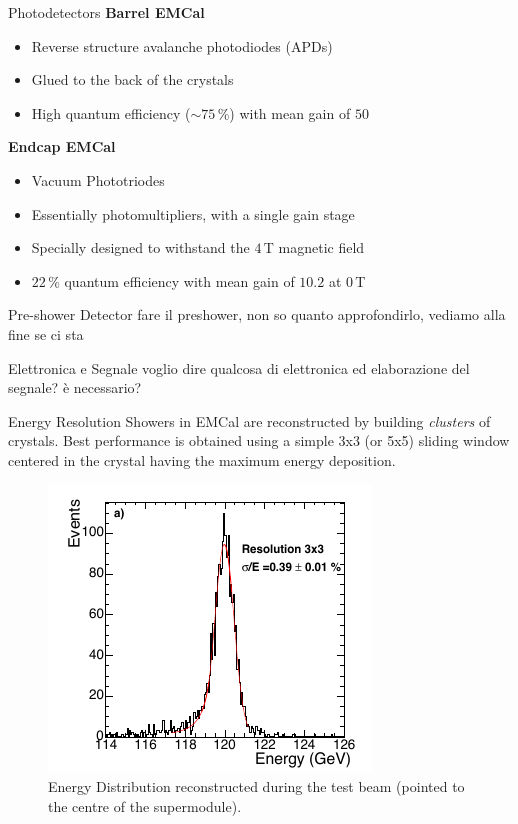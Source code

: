 \documentclass[10pt]{beamer}
\begin{document}
\begin{frame}{Photodetectors}
    \textbf{Barrel EMCal}
    \begin{itemize}
        \item Reverse structure avalanche photodiodes (APDs)
        \item Glued to the back of the crystals
        \item High quantum efficiency ($\sim 75$\,\%) with mean gain of $50$
    \end{itemize}{}
    
    \textbf{Endcap EMCal}
    \begin{itemize}
        \item Vacuum Phototriodes
        \item Essentially photomultipliers, with a single gain stage
        \item Specially designed to withstand the $4$\,T magnetic field
        \item $22$\,\% quantum efficiency with mean gain of $10.2$ at $0$\,T
    \end{itemize}
\end{frame}

\begin{frame}{Pre-shower Detector}
        fare il preshower, non so quanto approfondirlo, vediamo alla fine se ci sta
\end{frame}

\begin{frame}{Elettronica e Segnale}
    voglio dire qualcosa di elettronica ed elaborazione del segnale? è necessario?
\end{frame}

\begin{frame}{Energy Resolution}
    Showers in EMCal are reconstructed by building \emph{clusters} of crystals. Best performance is obtained using a simple 3x3 (or 5x5) sliding window centered in the crystal having the maximum energy deposition.
    \begin{figure}
        \centering
        \includegraphics[width=.85\textwidth]{./img/resolution_1.png}
        \caption{Energy Distribution reconstructed during the test beam (pointed to the centre of the supermodule).}
        \label{fig:res1}
    \end{figure}{}
\end{frame}
\end{document}
